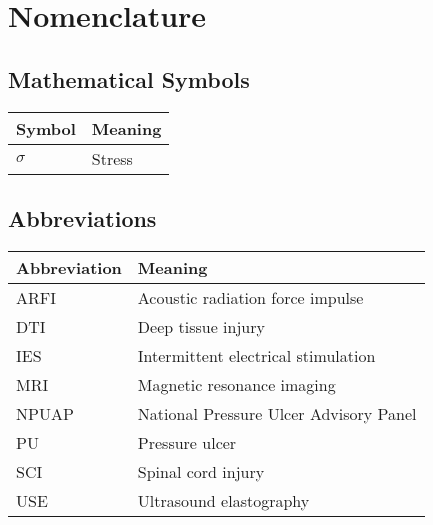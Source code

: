 \chapter*{Nomenclature}
	\section*{Mathematical Symbols}
		\begin{longtable}[l]{ll}
			Symbol & Meaning \\
			\hline \endhead
			$\sigma$ & Stress \\
		\end{longtable}

	\section*{Abbreviations}
		\begin{longtable}[l]{ll}
			Abbreviation & Meaning \\
			\hline \endhead
			ARFI & Acoustic radiation force impulse \\
			DTI & Deep tissue injury \\
			IES & Intermittent electrical stimulation \\
			MRI & Magnetic resonance imaging \\
			NPUAP & National Pressure Ulcer Advisory Panel \\
			PU & Pressure ulcer \\
			SCI & Spinal cord injury \\
			USE & Ultrasound elastography \\
		\end{longtable}